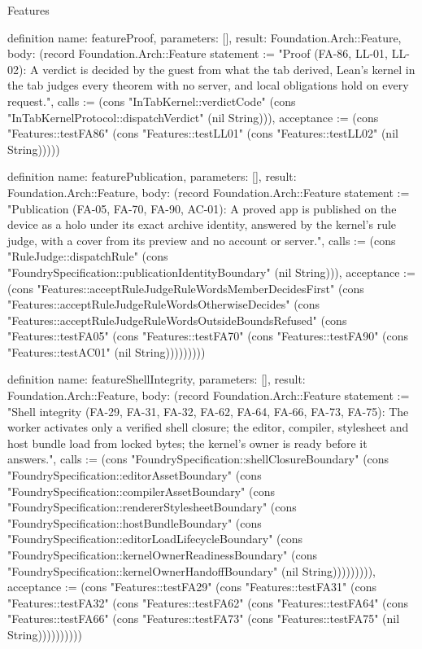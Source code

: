 \begin{lexlean}{Features}
\begin{semanticmodule}
definition{
  name: featureProof,
  parameters: [],
  result: Foundation.Arch::Feature,
  body: (record Foundation.Arch::Feature {statement := "Proof (FA-86, LL-01, LL-02): A verdict is decided by the guest from what the tab derived, Lean's kernel in the tab judges every theorem with no server, and local obligations hold on every request.", calls := (cons "InTabKernel::verdictCode" (cons "InTabKernelProtocol::dispatchVerdict" (nil String))), acceptance := (cons "Features::testFA86" (cons "Features::testLL01" (cons "Features::testLL02" (nil String))))})
}

definition{
  name: featurePublication,
  parameters: [],
  result: Foundation.Arch::Feature,
  body: (record Foundation.Arch::Feature {statement := "Publication (FA-05, FA-70, FA-90, AC-01): A proved app is published on the device as a holo under its exact archive identity, answered by the kernel's rule judge, with a cover from its preview and no account or server.", calls := (cons "RuleJudge::dispatchRule" (cons "FoundrySpecification::publicationIdentityBoundary" (nil String))), acceptance := (cons "Features::acceptRuleJudgeRuleWordsMemberDecidesFirst" (cons "Features::acceptRuleJudgeRuleWordsOtherwiseDecides" (cons "Features::acceptRuleJudgeRuleWordsOutsideBoundsRefused" (cons "Features::testFA05" (cons "Features::testFA70" (cons "Features::testFA90" (cons "Features::testAC01" (nil String))))))))})
}

definition{
  name: featureShellIntegrity,
  parameters: [],
  result: Foundation.Arch::Feature,
  body: (record Foundation.Arch::Feature {statement := "Shell integrity (FA-29, FA-31, FA-32, FA-62, FA-64, FA-66, FA-73, FA-75): The worker activates only a verified shell closure; the editor, compiler, stylesheet and host bundle load from locked bytes; the kernel's owner is ready before it answers.", calls := (cons "FoundrySpecification::shellClosureBoundary" (cons "FoundrySpecification::editorAssetBoundary" (cons "FoundrySpecification::compilerAssetBoundary" (cons "FoundrySpecification::rendererStylesheetBoundary" (cons "FoundrySpecification::hostBundleBoundary" (cons "FoundrySpecification::editorLoadLifecycleBoundary" (cons "FoundrySpecification::kernelOwnerReadinessBoundary" (cons "FoundrySpecification::kernelOwnerHandoffBoundary" (nil String))))))))), acceptance := (cons "Features::testFA29" (cons "Features::testFA31" (cons "Features::testFA32" (cons "Features::testFA62" (cons "Features::testFA64" (cons "Features::testFA66" (cons "Features::testFA73" (cons "Features::testFA75" (nil String)))))))))})
}


\end{semanticmodule}
\end{lexlean}

